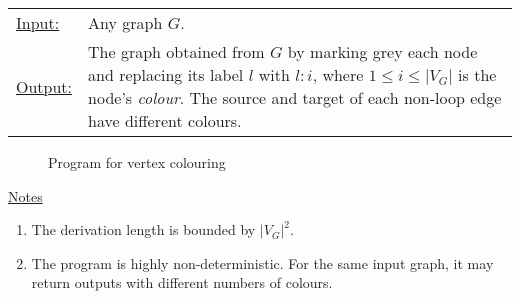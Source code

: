 \begin{example}

\begin{tabular}{lp{10.5cm}}
\ul{Input:} & Any graph $G$. \\
\ul{Output:} & The graph obtained from $G$\/ by marking grey each node and replacing its label $l$\/ with $l{:}i$, where $1 \leq i \leq |V_G|$ is the node's \emph{colour}. The source and target of each non-loop edge have different colours.
\end{tabular}
  
\begin{figure}[htb]
\begin{center}
 
\end{center}
\caption{Program for vertex colouring}\label{fig:vertex-colouring}
\end{figure}

\ul{Notes}
\begin{enumerate}
\setlength{\itemsep}{-.5ex}
\item The derivation length is bounded by $|V_G|^2$.
\item The program is highly non-deterministic. For the same input graph, it may return outputs with different numbers of colours.
\end{enumerate}
\end{example}

